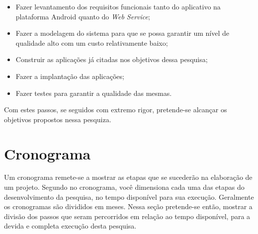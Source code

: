 \begin{itemize}

	\item Fazer levantamento dos requisitos funcionais tanto do aplicativo na
	plataforma Android quanto do \textit{Web Service};

	\item Fazer a modelagem do sistema para que se possa garantir um nível de
	qualidade alto com um custo relativamente baixo;

	\item Construir as aplicações já citadas nos objetivos dessa pesquisa;

	\item Fazer a implantação das aplicações;

	\item Fazer testes para garantir a qualidade das mesmas.

\end{itemize}

	\par Com estes passos, se seguidos com extremo rigor, pretende-se alcançar os
objetivos propostos nessa pesquiza.


\pagebreak
\section{Cronograma}

	\par Um cronograma remete-se a mostrar as etapas que se sucederão na
elaboração de um projeto. Segundo  no cronograma, você
dimensiona cada uma das etapas do desenvolvimento da pesquisa, no tempo
disponível para sua execução. Geralmente os cronogramas são divididos em meses.
Nessa seção pretende-se então, mostrar a divisão dos passos que seram
percorridos em relação ao tempo disponível, para a devida e completa execução
desta pesquisa.


